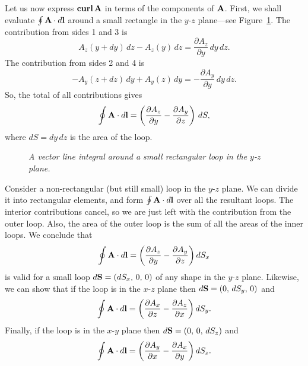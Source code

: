 Let us now express ${\bf curl}\,{\bf A}$ in terms of the components of ${\bf A}$.
First, we shall
 evaluate $\oint {\bf A}\cdot d{\bf l}$ around a small rectangle in the
$y$-$z$ plane---see Figure~\ref{f21}.
The contribution from sides 1 and 3 is
\begin{equation}
A_z(y+dy)\,dz - A_z(y)\,dz = \frac{\partial A_z}{\partial y} \,dy\,dz.
\end{equation}
The contribution from sides 2 and 4 is
\begin{equation}
-A_y(z+dz)\,dy + A_y(z)\,dy = -\frac{\partial A_y}{\partial y}\,dy\,dz.
\end{equation}
So, the total of all contributions gives
\begin{equation}
\oint {\bf A}\cdot d{\bf l} = \left(\frac{\partial A_z}{\partial y}-
\frac{\partial A_y}{\partial z}\right)\,dS,
\end{equation}
where $dS=dy\,dz$ is the area of the loop. 
\begin{figure}
\epsfysize=2in
\centerline{}
\caption{\em A vector line integral around a small rectangular loop in the $y$-$z$ plane.}\label{f21}
\end{figure}

Consider a non-rectangular (but still small) loop in the $y$-$z$ plane.
We can divide it into rectangular
 elements, and form $\oint {\bf A}\cdot d{\bf l}$ over all the resultant 
loops. The interior 
contributions cancel, so we are just left with the contribution from the outer loop.
Also, the area of the outer loop is the sum of all the areas of the inner loops.
We conclude that 
\begin{equation}
\oint {\bf A} \cdot d{\bf l} = \left(\frac{\partial A_z}{\partial y}-
\frac{\partial A_y}{\partial z}\right) dS_x
\end{equation}
is valid for a small loop 
$d{\bf S} = (dS_x,\,0,\,0)$ of any shape in the $y$-$z$ plane. Likewise, we can show that
if the loop is in the $x$-$z$ plane then $d{\bf S} = (0,\,dS_y,\,0)$ and
\begin{equation}
\oint {\bf A} \cdot d{\bf l} = \left(\frac{\partial A_x}{\partial z}-
\frac{\partial A_z}{\partial x}\right) dS_y.
\end{equation}
Finally, if the loop is in the $x$-$y$ plane then $d{\bf S} = (0,\,0,\,dS_z)$ and
\begin{equation}
\oint {\bf A} \cdot d{\bf l} = \left(\frac{\partial A_y}{\partial x}-
\frac{\partial A_x}{\partial y}\right) dS_z.
\end{equation}

